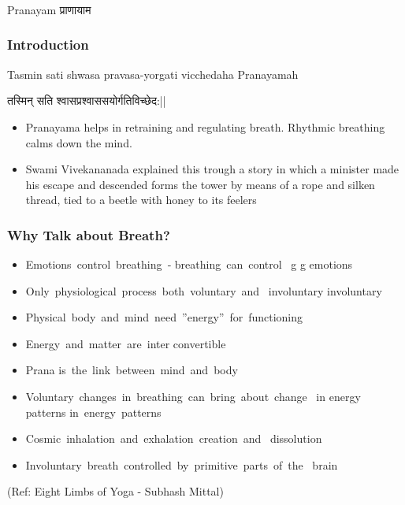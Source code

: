 \begin{frame}[fragile]\frametitle{}
\begin{center}
{\Large Pranayam प्राणायाम}
\end{center}
\end{frame}

\begin{frame}[fragile]\frametitle{Introduction}

Tasmin sati shwasa pravasa-yorgati vicchedaha Pranayamah

तस्मिन् सति श्वासप्रश्वाससयोर्गतिविच्छेद:||

	\begin{itemize}
	\item Pranayama  helps  in  retraining 
and  regulating  breath. 
Rhythmic  breathing  calms 
down  the  mind.  
	\item Swami 
Vivekananada  explained  this 
trough  a  story  in  which  a 
minister  made  his  escape  and 
descended forms the tower by 
means  of  a  rope  and  silken 
thread,  tied  to  a  beetle  with 
honey to its feelers 
	\end{itemize}

\end{frame}

\begin{frame}[fragile]\frametitle{Why Talk about Breath? }


	\begin{itemize}
	\item   Emotions control breathing ‐ breathing can control  g g
emotions
	\item    Only physiological process both voluntary and 
involuntary involuntary
	\item   Physical body and mind need ''energy'' for functioning
	\item    Energy and matter are inter convertible
	\item   Prana is the link between mind and body
	\item   Voluntary changes in breathing can bring about change 
in energy patterns in energy patterns
	\item   Cosmic inhalation and exhalation creation and 
dissolution
	\item   Involuntary breath controlled by primitive parts of the 
brain
	\end{itemize}

\tiny{(Ref: Eight Limbs of Yoga - Subhash Mittal)}

\end{frame}

